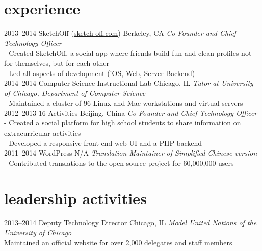 \section{experience}

\begin{entrylist}
\entry
{2013--2014}
{SketchOff \quad\normalfont (\underline{sketch-off.com})}
{Berkeley, CA}
{\emph{Co-Founder and Chief Technology Officer} \\
- Created SketchOff, a social app where friends build fun and clean profiles not for themselves, but for each other \\
- Led all aspects of development (iOS, Web, Server Backend) \\}
\entry
{2014--2014}
{Computer Science Instructional Lab}
{Chicago, IL}
{\emph{Tutor at University of Chicago, Department of Computer Science} \\
- Maintained a cluster of 96 Linux and Mac workstations and virtual servers\\}
\entry
{2012--2013}
{16 Activities}
{Beijing, China}
{\emph{Co-Founder and Chief Technology Officer} \\
- Created a social platform for high school students to share information on extracurricular activities \\
- Developed a responsive front-end web UI and a PHP backend \\}
\entry
{2011--2014}
{WordPress}
{N/A}
{\emph{Translation Maintainer of Simplified Chinese version} \\
-   Contributed translations to the open-source project for 60,000,000 users \\}
\end{entrylist}

\section{leadership activities}

\begin{entrylist}
\entry
{2013--2014}
{Deputy Technology Director}
{Chicago, IL}
{\emph{Model United Nations of the University of Chicago} \\
Maintained an official website for over 2,000 delegates and staff members \\}
\end{entrylist}

